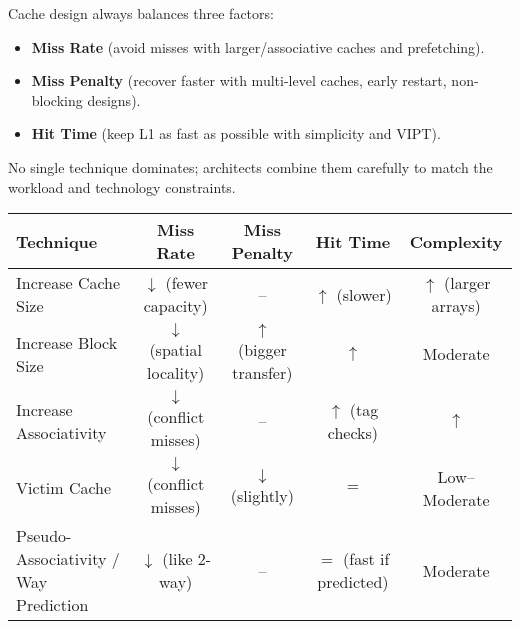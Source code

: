 \highspace
Cache design always balances three factors:
\begin{itemize}
    \item \textbf{Miss Rate} (avoid misses with larger/associative caches and prefetching).
    \item \textbf{Miss Penalty} (recover faster with multi-level caches, early restart, non-blocking designs).
    \item \textbf{Hit Time} (keep L1 as fast as possible with simplicity and VIPT).
\end{itemize}
No single technique dominates; architects combine them carefully to match the workload and technology constraints.

\newpage

\begin{landscape}
    \begin{table}[p]
        \centering
        \begin{adjustbox}{max width=\linewidth,center}
            \begin{tabular}{@{} l c c c c @{}}
            \toprule
            \textbf{Technique} & \textbf{Miss Rate} & \textbf{Miss Penalty} & \textbf{Hit Time} & \textbf{Complexity} \\
            \midrule
            Increase Cache Size                     & $\downarrow$ (fewer capacity)             & --                                        & $\uparrow$ (slower)                           & $\uparrow$ (larger arrays)    \\ [.3em]
            Increase Block Size                     & $\downarrow$ (spatial locality)           & $\uparrow$ (bigger transfer)              & $\uparrow$                                    & Moderate                      \\ [.3em]
            Increase Associativity                  & $\downarrow$ (conflict misses)            & --                                        & $\uparrow$ (tag checks)                       & $\uparrow$                    \\ [.3em]
            Victim Cache                            & $\downarrow$ (conflict misses)            & $\downarrow$ (slightly)                   & $=$                                           & Low--Moderate                 \\ [.3em]
            Pseudo-Associativity / Way Prediction   & $\downarrow$ (like 2-way)                 & --                                        & $=$ (fast if predicted)                       & Moderate                      \\ [.3em]

\end{tabular}
\end{adjustbox}
\end{table}
\end{landscape}
